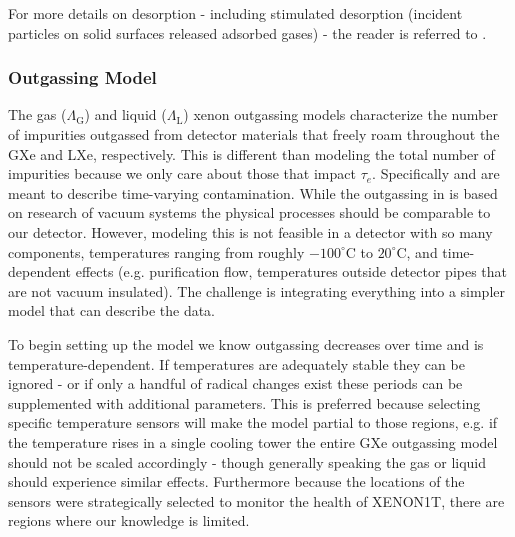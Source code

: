 For more details on desorption - including stimulated desorption (incident particles on solid surfaces released adsorbed gases) - the
reader is referred to .



\subsubsection{Outgassing Model}
\label{subsubsec:electron_lifetime_model_outgassing_model}
The gas ($\Lambda_{\mathrm{G}}$) and liquid ($\Lambda_{\mathrm{L}}$) xenon outgassing models characterize the number of impurities outgassed from detector
materials that freely roam throughout
the GXe and LXe, respectively.  This is different than modeling the total number of impurities because we only care about those
that impact $\tau_e$.  Specifically \outg and \outl are meant to describe time-varying contamination.  While the outgassing in
 is based on research of vacuum systems the physical processes should be
comparable to our detector.  However, modeling this is not feasible in a detector with so
many components, temperatures ranging from roughly $-100^{\circ} \mathrm{C}$ to $20^{\circ} \mathrm{C}$, and time-dependent effects (e.g.
purification flow, temperatures outside detector pipes that are not vacuum insulated).  The challenge is integrating everything into
a simpler model that can describe the data.

To begin setting up the model we know outgassing decreases over time and is temperature-dependent.  If temperatures
are adequately stable they can be ignored - or if only a handful of radical changes exist these periods can be supplemented with
additional parameters.  This is preferred because selecting specific temperature sensors will make the model
partial to those regions, e.g. if the temperature rises in a single cooling tower the entire GXe outgassing model should not be scaled
accordingly - though generally speaking the gas or liquid should experience similar effects.  Furthermore because the locations of the
sensors were strategically selected to monitor the health of XENON1T, there are regions where our knowledge is limited.

